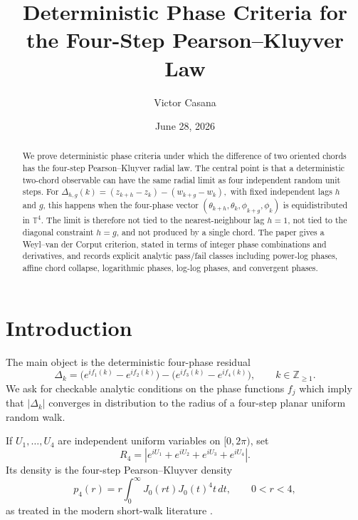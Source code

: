 \documentclass[11pt]{amsart}
\title{Deterministic Phase Criteria for the Four-Step Pearson--Kluyver Law}
\author{Victor Casana}
\date{June 28, 2026}
\numberwithin{equation}{section}
\theoremstyle{plain}
\theoremstyle{definition}
\theoremstyle{remark}
\begin{document}
\begin{abstract}
We prove deterministic phase criteria under which the difference of two oriented chords has the four-step Pearson--Kluyver radial law. The central point is that a deterministic two-chord observable can have the same radial limit as four independent random unit steps. For
\(
\Delta_{h,g}(k)=(z_{k+h}-z_k)-(w_{k+g}-w_k),
\)
with fixed independent lags \(h\) and \(g\), this happens when the four-phase vector
\((\theta_{k+h},\theta_k,\phi_{k+g},\phi_k)\) is equidistributed in \(\mathbb T^4\). The limit is therefore not tied to the nearest-neighbour lag \(h=1\), not tied to the diagonal constraint \(h=g\), and not produced by a single chord. The paper gives a Weyl--van der Corput criterion, stated in terms of integer phase combinations and derivatives, and records explicit analytic pass/fail classes including power-log phases, affine chord collapse, logarithmic phases, log-log phases, and convergent phases.
\end{abstract}

\maketitle
\tableofcontents

\section{Introduction}
\label{sec:introduction}
The main object is the deterministic four-phase residual
\begin{equation}
\Delta_k=
\bigl(e^{if_1(k)}-e^{if_2(k)}\bigr)
-
\bigl(e^{if_3(k)}-e^{if_4(k)}\bigr),
\qquad k\in\mathbb Z_{\geq1}.
\label{eq:delta_general}
\end{equation}
We ask for checkable analytic conditions on the phase functions \(f_j\) which imply that \(|\Delta_k|\) converges in distribution to the radius of a four-step planar uniform random walk.

If \(U_1,\ldots,U_4\) are independent uniform variables on \([0,2\pi)\), set
\begin{equation}
R_4=\left|e^{iU_1}+e^{iU_2}+e^{iU_3}+e^{iU_4}\right|.
\label{eq:R4}
\end{equation}
Its density is the four-step Pearson--Kluyver density
\begin{equation}
p_4(r)=r\int_0^\infty J_0(rt)J_0(t)^4t\,dt,
\qquad 0<r<4,
\label{eq:p4}
\end{equation}
as treated in the modern short-walk literature \cite{BorweinEtAl2012,BorweinStraubWan2013,Zhou2019}.
\end{document}
